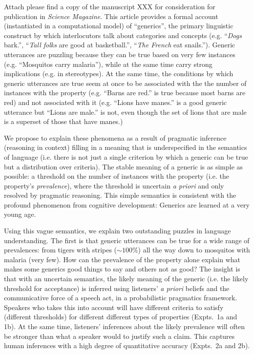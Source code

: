 \documentclass[10pt,stdletter,dateno,sigleft]{newlfm} %
\begin{document}
\begin{newlfm}


Attach please find a copy of the manuscript XXX %
 for consideration for publication in \emph{Science Magazine}. This article provides a formal account (instantiated in a computational model) of ``generics'', the primary linguistic construct by which interlocutors talk about categories and concepts (e.g. ``\emph{Dogs} bark.'', ``\emph{Tall folks} are good at basketball.'', ``\emph{The French} eat snails.'').  Generic utterances are puzzling because they can be true based on very few instances (e.g. ``Mosquitos carry malaria''), while at the same time carry strong implications (e.g. in stereotypes). At the same time, the conditions by which generic utterances are true seem at once to be associated with the the number of instances with the property (e.g. ``Barns are red.'' is true because most barns are red) and not associated with it (e.g. ``Lions have manes.'' is a good generic utterance but ``Lions are male.'' is not, even though the set of lions that are male is a superset of those that have manes.)

We propose to explain these phenomena as a result of pragmatic inference (reasoning in context) filling in a meaning that is underspecified in the semantics of language (i.e. there is not just a single criterion by which a generic can be true but a distribution over criteria). 
The stable meaning of a generic is as simple as possible: a threshold on the number of instances with the property (i.e. the property's \emph{prevalence}), where the threshold is uncertain \emph{a priori} and only resolved by pragmatic reasoning.
This simple semantics is consistent with the profound phenomenon from cognitive development: Generics are learned at a very young age.

Using this vague semantics, we explain two outstanding puzzles in language understanding. 
The first is that generic utterances can be true for a wide range of prevalences: from tigers with stripes ($\sim 100\%$) all the way down to mosquitos with malaria (very few). 
How can the prevalence of the property alone explain what makes some generics good things to say and others not as good? 
The insight is that with an uncertain semantics, the likely meaning of the generic (i.e. the likely threshold for acceptance) is inferred using listeners' \emph{a priori} beliefs and the communicative force of a speech act, in a probabilistic pragmatics framework. Speakers who takes this into account will have different criteria to satisfy (different thresholds) for different different types of properties (Expts.~1a and 1b). At the same time, listeners' inferences about the likely prevalence will often be stronger than what a speaker would to justify such a claim. This captures human inferences with a high degree of quantitative accuracy (Expts.~2a and 2b). 


\end{newlfm}
\end{document}
